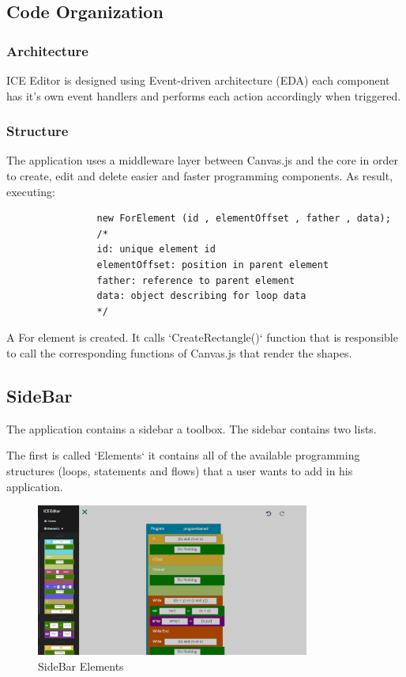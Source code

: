 \documentclass[paper=a4, fontsize=11pt]{scrartcl}
\begin{document}
	\subsection{Code Organization}

		\subsubsection{Architecture}
			ICE Editor is designed using Event-driven architecture (EDA) each component has it's own event handlers and performs each action accordingly when triggered.

		\subsubsection{Structure}
			The application uses a middleware layer between Canvas.js and the core in order to create, edit and delete easier and faster programming components. As result, executing: 

			\begin{lstlisting}
				new ForElement (id , elementOffset , father , data);
				/*
				id: unique element id
				elementOffset: position in parent element
				father: reference to parent element
				data: object describing for loop data
				*/
			\end{lstlisting}

			A For element is created. It calls `CreateRectangle()` function that is responsible to call the corresponding functions of Canvas.js that render the shapes.

	\subsection{SideBar}
		The application contains a sidebar a toolbox. The sidebar contains two lists.

		The first is called `Elements` it contains all of the available programming structures (loops, statements and flows) that a user wants to add in his application.
		\begin{figure}[ht!]
		\centering
		\includegraphics[width=90mm]{images/sideBarElements.jpg}
		\caption{SideBar Elements \label{sideBarElements}}
		\end{figure}
\end{document}

